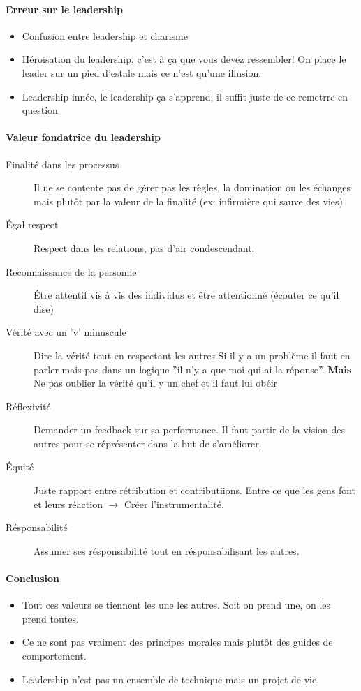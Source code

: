 \documentclass[11pt]{article} %
\begin{document}
\paragraph{Erreur sur le leadership}
\begin{itemize}
\item{Confusion entre leadership et charisme}
\item{Héroisation du leadership}, c'est à ça que vous devez ressembler! On 
place le leader sur un pied d'estale mais ce n'est qu'une illusion. 
\item{Leadership innée}, le leadership ça s'apprend, il suffit juste de ce remetrre 
en question
\end{itemize}
\paragraph{Valeur fondatrice du leadership}
\begin{description}
\item[Finalité dans les processus] Il ne se contente pas de gérer pas les règles, 
la domination ou les échanges mais plutôt par la valeur de la finalité (ex:
infirmière qui sauve des vies)
\item[Égal respect] Respect dans les relations, pas d'air condescendant.
\item[Reconnaissance de la personne] Étre attentif vis à vis des individus et
être attentionné (écouter ce qu'il dise)
\item[Vérité avec un 'v' minuscule] Dire la vérité tout en respectant les autres
Si il y a un problème il faut en parler mais pas dans un logique ''il n'y a que moi qui 
ai la réponse''. \textbf{Mais} Ne pas oublier la vérité qu'il y un chef et il faut lui obéir
\item[Réflexivité] Demander un feedback sur sa performance. Il faut partir
de la vision des autres pour se réprésenter dans la but de s'améliorer.
\item[Équité] Juste rapport entre rétribution et contributiions. Entre ce que les gens 
font et leurs réaction $\to$ Créer l'instrumentalité.
\item[Résponsabilité] Assumer ses résponsabilité tout en résponsabilisant les autres.
\end{description}
\paragraph{Conclusion} 
\begin{itemize}
\item Tout ces valeurs se tiennent les une les autres. Soit on prend une, on les
prend toutes.
\item Ce ne sont pas vraiment des principes morales mais plutôt des guides de 
comportement.
\item Leadership n'est pas un ensemble de technique mais un projet de vie.
\end{itemize}
\end{document}
